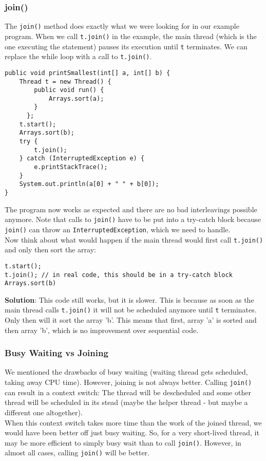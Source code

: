 \documentclass[main.tex]{subfiles}
\begin{document}
\subsubsection{join()}
The \texttt{join()} method does exactly what we were looking for in our example program. When we call \texttt{t.join()} in the example, the main thread (which is the one executing the statement) pauses its execution until \texttt{t} terminates. We can replace the while loop with a call to \texttt{t.join()}.
\begin{verbatim}
public void printSmallest(int[] a, int[] b) {
    Thread t = new Thread() {
        public void run() {
            Arrays.sort(a);
        }
      };
    t.start();
    Arrays.sort(b);
    try {
        t.join();
    } catch (InterruptedException e) {
        e.printStackTrace();
    }
    System.out.println(a[0] + " " + b[0]);
}
\end{verbatim}
The program now works as expected and there are no bad interleavings possible anymore. Note that calls to \texttt{join()} have to be put into a try-catch block because \texttt{join()} can throw an \texttt{InterruptedException}, which we need to handle.\\[3mm]
Now think about what would happen if the main thread would first call \texttt{t.join()} and only then sort the array:
\begin{verbatim}
t.start();
t.join(); // in real code, this should be in a try-catch block
Arrays.sort(b)
\end{verbatim}
\textbf{Solution}: This code still works, but it is slower. This is because as soon as the main thread calls \texttt{t.join()} it will not be scheduled anymore until \texttt{t} terminates. Only then will it sort the array 'b'. This means that first, array 'a' is sorted and then array 'b', which is no improvement over sequential code.

\subsubsection{Busy Waiting vs Joining}
We mentioned the drawbacks of busy waiting (waiting thread gets scheduled, taking away CPU time). However, joining is not always better. Calling \texttt{join()} can result in a context switch: The thread will be descheduled and some other thread will be scheduled in its stead (maybe the helper thread - but maybe a different one altogether).\\
When this context switch takes more time than the work of the joined thread, we would have been better off just busy waiting. So, for a very short-lived thread, it may be more efficient to simply busy wait than to call \texttt{join()}. However, in almost all cases, calling \texttt{join()} will be better.
\end{document}
